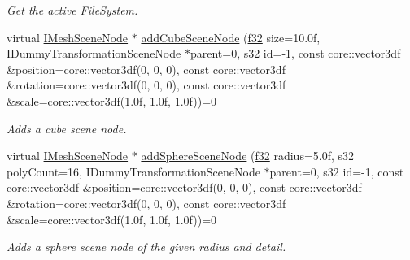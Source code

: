 \begin{DoxyCompactItemize}
\begin{DoxyCompactList}\small\item\em Get the active File\+System. \end{DoxyCompactList}\item 
virtual \hyperlink{classirr_1_1scene_1_1IMeshSceneNode}{I\+Mesh\+Scene\+Node} $\ast$ \hyperlink{classirr_1_1scene_1_1ISceneManager_afd4dcb2db5e5e03088ecf8be1b18224b}{add\+Cube\+Scene\+Node} (\hyperlink{namespaceirr_a0277be98d67dc26ff93b1a6a1d086b07}{f32} size=10.\+0f, I\+Dummy\+Transformation\+Scene\+Node $\ast$parent=0, s32 id=-\/1, const core\+::vector3df \&position=core\+::vector3df(0, 0, 0), const core\+::vector3df \&rotation=core\+::vector3df(0, 0, 0), const core\+::vector3df \&scale=core\+::vector3df(1.\+0f, 1.\+0f, 1.\+0f))=0
\begin{DoxyCompactList}\small\item\em Adds a cube scene node. \end{DoxyCompactList}\item 
virtual \hyperlink{classirr_1_1scene_1_1IMeshSceneNode}{I\+Mesh\+Scene\+Node} $\ast$ \hyperlink{classirr_1_1scene_1_1ISceneManager_a12969449cd9a4365657702a69315d1db}{add\+Sphere\+Scene\+Node} (\hyperlink{namespaceirr_a0277be98d67dc26ff93b1a6a1d086b07}{f32} radius=5.\+0f, s32 poly\+Count=16, I\+Dummy\+Transformation\+Scene\+Node $\ast$parent=0, s32 id=-\/1, const core\+::vector3df \&position=core\+::vector3df(0, 0, 0), const core\+::vector3df \&rotation=core\+::vector3df(0, 0, 0), const core\+::vector3df \&scale=core\+::vector3df(1.\+0f, 1.\+0f, 1.\+0f))=0
\begin{DoxyCompactList}\small\item\em Adds a sphere scene node of the given radius and detail. \end{DoxyCompactList}\item 

\end{DoxyCompactItemize}
